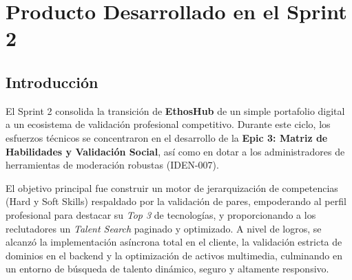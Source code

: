 \chapter{Producto Desarrollado en el Sprint 2}
\label{chap:sprint2}

\section{Introducción}
\label{sec:intro_sprint2}

El Sprint 2 consolida la transición de \textbf{EthosHub} de un simple portafolio digital a un ecosistema de validación profesional competitivo. Durante este ciclo, los esfuerzos técnicos se concentraron en el desarrollo de la \textbf{Epic 3: Matriz de Habilidades y Validación Social}, así como en dotar a los administradores de herramientas de moderación robustas (IDEN-007). 

El objetivo principal fue construir un motor de jerarquización de competencias (Hard y Soft Skills) respaldado por la validación de pares, empoderando al perfil profesional para destacar su \textit{Top 3} de tecnologías, y proporcionando a los reclutadores un \textit{Talent Search} paginado y optimizado. A nivel de logros, se alcanzó la implementación asíncrona total en el cliente, la validación estricta de dominios en el backend y la optimización de activos multimedia, culminando en un entorno de búsqueda de talento dinámico, seguro y altamente responsivo.